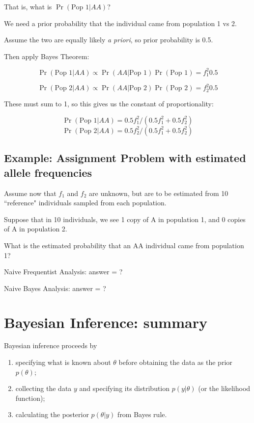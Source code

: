 That is, what is $\Pr(\text{Pop 1} | AA)$?

\es\bs
We need a prior probability that the individual came from population 1 vs 2.

Assume the two are equally likely {\it a priori}, so prior probability is 0.5.

Then apply Bayes Theorem:

$$\Pr(\text{Pop 1} | AA) \propto \Pr(AA | \text{Pop 1}) \Pr(\text{Pop 1}) = f_1^2 0.5$$

$$\Pr(\text{Pop 2} | AA) \propto \Pr(AA | \text{Pop 2}) \Pr(\text{Pop 2}) = f_2^2 0.5$$

These must sum to 1, so this gives us the constant of proportionality:

$$\Pr(\text{Pop 1} | AA) = 0.5 f_1^2 / (0.5 f_1^2 + 0.5 f_2^2)$$
$$\Pr(\text{Pop 2} | AA) = 0.5 f_2^2 / (0.5 f_1^2 + 0.5 f_2^2)$$

\es\bs

\subsection*{Example: Assignment Problem with estimated allele frequencies}

Assume now that $f_1$ and $f_2$ are unknown, but
are to be estimated from 10 ``reference" individuals sampled from each population.

Suppose that in 10 individuals, we see 1 copy of A in population 1, and 0 copies of A
in population 2. 

What is the estimated probability that an AA individual came from population 1?

Naive Frequentist Analysis: answer = ?

Naive Bayes Analysis: answer = ?
\es\bs

\section*{\hfil Bayesian Inference: summary}

Bayesian inference proceeds by
\begin{enumerate}
    \item specifying what is known about $\theta$ before obtaining the data as
the prior $p\left( \theta \right)$;
    \item collecting the data $y$ and
specifying its distribution $p\left( {\left. y \right|\theta } \right)$ (or
the likelihood function);
    \item calculating the posterior $p\left( {\left.
\theta \right|y} \right)$ from Bayes rule.
\end{enumerate}

